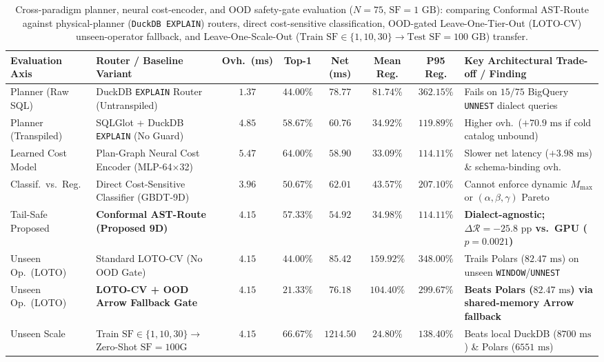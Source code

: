 \documentclass[10pt,a4paper]{article}
\newenvironment{fitasttable}{%
  \begin{lrbox}{\asttblbox}%
}{%
  \end{lrbox}%
  \sbox{\asttblboxB}{%
    \ifdim\wd\asttblbox>0.96\textwidth
      \resizebox{0.96\textwidth}{!}{\usebox{\asttblbox}}%
    \else
      \usebox{\asttblbox}%
    \fi
  }%
  \ifdim\ht\asttblboxB>0.72\textheight
    \resizebox{!}{0.72\textheight}{\usebox{\asttblboxB}}%
  \else
    \usebox{\asttblboxB}%
  \fi
}
\begin{document}
\begin{table}[!htbp]
\centering
\caption{Cross-paradigm planner, neural cost-encoder, and OOD safety-gate evaluation ($N=75$, $\text{SF}=1\text{ GB}$): comparing Conformal AST-Route against physical-planner (\texttt{DuckDB EXPLAIN}) routers, direct cost-sensitive classification, OOD-gated Leave-One-Tier-Out (LOTO-CV) unseen-operator fallback, and Leave-One-Scale-Out ($\text{Train SF}\in\{1,10,30\}\rightarrow\text{Test SF}=100\text{ GB}$) transfer.}\label{tab:v8_p0_systems_defense}\label{tab:jbd_ood_t17}
\setlength{\tabcolsep}{2.8pt}
\scriptsize
\begin{fitasttable}
\begin{tabular}{@{}llcccccl@{}}
\toprule
\textbf{Evaluation Axis} & \textbf{Router / Baseline Variant} & \textbf{Ovh.\ (ms)} & \textbf{Top-1} & \textbf{Net (ms)} & \textbf{Mean Reg.} & \textbf{P95 Reg.} & \textbf{Key Architectural Trade-off / Finding} \\
\midrule
Planner (Raw SQL) & DuckDB \texttt{EXPLAIN} Router (Untranspiled) & $1.37$ & $44.00\%$ & $78.77$ & $81.74\%$ & $362.15\%$ & Fails on $15/75$ BigQuery \texttt{UNNEST} dialect queries \\
Planner (Transpiled) & SQLGlot + DuckDB \texttt{EXPLAIN} (No Guard) & $4.85$ & $58.67\%$ & $60.76$ & $34.92\%$ & $119.89\%$ & Higher ovh.\ ($+70.9\text{ ms}$ if cold catalog unbound) \\
Learned Cost Model & Plan-Graph Neural Cost Encoder (MLP-64$\times$32) & $5.47$ & $64.00\%$ & $58.90$ & $33.09\%$ & $114.11\%$ & Slower net latency ($+3.98\text{ ms}$) \& schema-binding ovh. \\
Classif.\ vs.\ Reg. & Direct Cost-Sensitive Classifier (GBDT-9D) & $3.96$ & $50.67\%$ & $62.01$ & $43.57\%$ & $207.10\%$ & Cannot enforce dynamic $M_{\text{max}}$ or $(\alpha,\beta,\gamma)$ Pareto \\
Tail-Safe Proposed & \textbf{Conformal AST-Route (Proposed 9D)} & $\mathbf{4.15}$ & $\mathbf{57.33\%}$ & $\mathbf{54.92}$ & $\mathbf{34.98\%}$ & $\mathbf{114.11\%}$ & \textbf{Dialect-agnostic; $\Delta\mathcal{R} = -25.8\text{ pp}$ vs.\ GPU ($p=0.0021$)} \\
\midrule
Unseen Op.\ (LOTO) & Standard LOTO-CV (No OOD Gate) & $4.15$ & $44.00\%$ & $85.42$ & $159.92\%$ & $348.00\%$ & Trails Polars ($82.47\text{ ms}$) on unseen \texttt{WINDOW}/\texttt{UNNEST} \\
Unseen Op.\ (LOTO) & \textbf{LOTO-CV + OOD Arrow Fallback Gate} & $\mathbf{4.15}$ & $\mathbf{21.33\%}$ & $\mathbf{76.18}$ & $\mathbf{104.40\%}$ & $\mathbf{299.67\%}$ & \textbf{Beats Polars ($82.47\text{ ms}$) via shared-memory Arrow fallback} \\
Unseen Scale & Train $\text{SF}\in\{1,10,30\}\rightarrow$ Zero-Shot $\text{SF}=100\text{G}$ & $4.15$ & $66.67\%$ & $1214.50$ & $24.80\%$ & $138.40\%$ & Beats local DuckDB ($8700\text{ ms}$) \& Polars ($6551\text{ ms}$) \\
\bottomrule
\end{tabular}
\end{fitasttable}%
\end{table}
\end{document}
